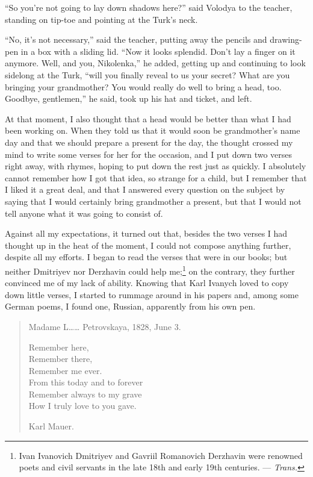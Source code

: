 ``So you're not going to lay down shadows here?'' said Volodya to the teacher, standing on tip-toe and pointing at the Turk's neck. %

``No, it's not necessary,'' said the teacher, putting away the pencils and drawing-pen in a box with a sliding lid. ``Now it looks splendid. Don't lay a finger on it anymore. Well, and you, Nikolenka,'' he added, getting up and continuing to look sidelong at the Turk, ``will you finally reveal to us your secret? What are you bringing your grandmother? You would really do well to bring a head, too. Goodbye, gentlemen,'' he said, took up his hat and ticket, and left.

At that moment, I also thought that a head would be better than what I had been working on. When they told us that it would soon be grandmother's name day and that we should prepare a present for the day, the thought crossed my mind to write some verses for her for the occasion, and I put down two verses right away, with rhymes, hoping to put down the rest just as quickly. I absolutely cannot remember how I got that idea, so strange for a child, but I remember that I liked it a great deal, and that I answered every question on the subject by saying that I would certainly bring grandmother a present, but that I would not tell anyone what it was going to consist of.

Against all my expectations, it turned out that, besides the two verses I had thought up in the heat of the moment, I could not compose anything further, despite all my efforts. I began to read the verses that were in our books; but neither Dmitriyev nor Derzhavin could help me;\footnote{Ivan Ivanovich Dmitriyev and Gavriil Romanovich Derzhavin were renowned poets and civil servants in the late 18th and early 19th centuries. --- \textit{Trans.}} on the contrary, they further convinced me of my lack of ability. Knowing that Karl Ivanych loved to copy down little verses, I started to rummage around in his papers and, among some German poems, I found one, Russian, apparently from his own pen.

\begin{verse}
Madame L\ldots{}\ldots{} Petrovskaya, 1828, June 3.

Remember here,\\
Remember there,\\
Remember me ever.\\
From this today and to forever\\
Remember always to my grave\\
How I truly love to you gave.

Karl Mauer.
\end{verse}

